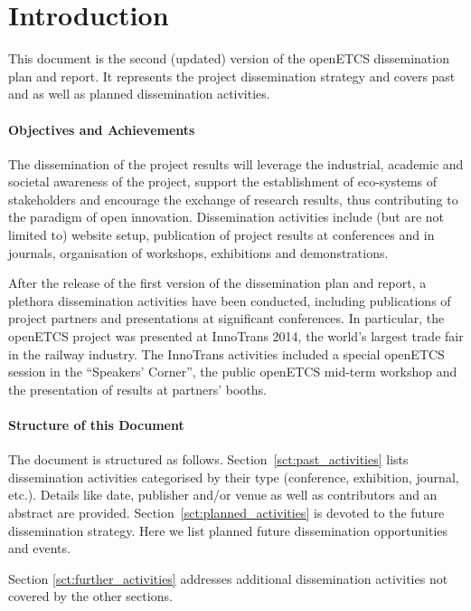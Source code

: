 \section{Introduction}

This document is the second (updated) version of the openETCS dissemination plan and report. It represents the project dissemination strategy and covers past and as well as planned dissemination activities.

\paragraph{Objectives and Achievements}
The dissemination of the project results will leverage the industrial, academic and societal awareness of the project, support the establishment of eco-systems of stakeholders and encourage the exchange of research results, thus contributing to the paradigm of open innovation. Dissemination activities include (but are not limited to) website setup, publication of project results at conferences and in journals, organisation of workshops, exhibitions and demonstrations.

After the release of the first version of the dissemination plan and report, a plethora dissemination activities have been conducted, including publications of project partners and presentations at significant conferences. In particular, the openETCS project was presented at InnoTrans 2014, the world's largest trade fair in the railway industry. The InnoTrans activities included a special openETCS session in the ``Speakers' Corner'', the public openETCS mid-term workshop and the presentation of results at partners' booths.

\paragraph{Structure of this Document}
The document is structured as follows. Section~\ref{sct:past_activities} lists dissemination activities categorised by their type (conference, exhibition, journal, etc.). Details like date, publisher and/or venue as well as contributors and an abstract are provided. Section~\ref{sct:planned_activities} is devoted to the future dissemination strategy. Here we list planned future dissemination opportunities and events.

Section \ref{sct:further_activities} addresses additional dissemination activities not covered by the other sections.
